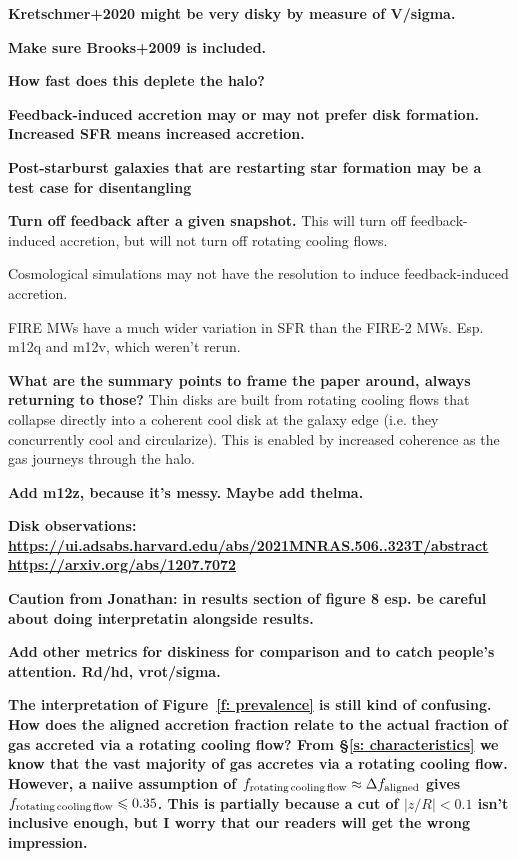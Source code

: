 \documentclass[fleqn,usenatbib]{mnras}
\begin{document}
\textbf{Kretschmer+2020 might be very disky by measure of V/sigma.}

\textbf{Make sure Brooks+2009 is included.}

\textbf{How fast does this deplete the halo?}

\textbf{
Feedback-induced accretion may or may not prefer disk formation.
Increased SFR means increased accretion.
}

\textbf{
Post-starburst galaxies that are restarting star formation may be a test case for disentangling 
}

\textbf{Turn off feedback after a given snapshot.}
This will turn off feedback-induced accretion, but will not turn off rotating cooling flows.

Cosmological simulations may not have the resolution to induce feedback-induced accretion.

FIRE MWs have a much wider variation in SFR than the FIRE-2 MWs.
Esp. m12q and m12v, which weren't rerun.

\textbf{What are the summary points to frame the paper around, always returning to those?}
Thin disks are built from rotating cooling flows that collapse directly into a coherent cool disk at the galaxy edge (i.e. they concurrently cool and circularize).
This is enabled by increased coherence as the gas journeys through the halo.

\textbf{Add m12z, because it's messy.}
\textbf{Maybe add thelma.}

\textbf{Disk observations:
\url{https://ui.adsabs.harvard.edu/abs/2021MNRAS.506..323T/abstract}
\url{https://arxiv.org/abs/1207.7072}
}

\textbf{
Caution from Jonathan: in results section of figure 8 esp. be careful about doing interpretatin alongside results.
}

\textbf{Add other metrics for diskiness for comparison and to catch people's attention.
Rd/hd, vrot/sigma.
}

\textbf{
The interpretation of Figure~\ref{f: prevalence} is still kind of confusing.
How does the aligned accretion fraction relate to the actual fraction of gas accreted via a rotating cooling flow?
From \S\ref{s: characteristics} we know that the vast majority of gas accretes via a rotating cooling flow.
However, a naiive assumption of $f_{\rm rotating\,cooling\,flow} \approx \Delta f_{\rm aligned}$ gives $f_{\rm rotating\,cooling\,flow} \le 0.35$.
This is partially because a cut of $\vert z/R\vert < 0.1$ isn't inclusive enough, but I worry that our readers will get the wrong impression.
}
\end{document}
